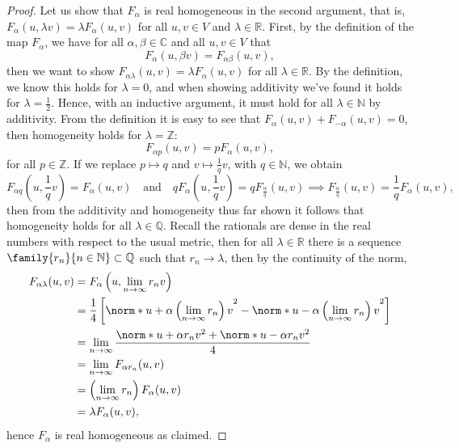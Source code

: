 \begin{proof}
    Let us show that \(F_{\alpha}\) is real homogeneous in the second argument, that is, \(F_{\alpha}(u,\lambda v) = \lambda F_{\alpha}(u,v)\) for all \(u,v \in V\) and \(\lambda \in \mathbb{R}\). First, by the definition of the map \(F_{\alpha}\), we have for all \(\alpha, \beta \in \mathbb{C}\) and all \(u, v \in V\) that
    \begin{equation*}
        F_{\alpha}(u, \beta v) = F_{\alpha \beta}(u, v),
    \end{equation*}
    then we want to show \(F_{\alpha \lambda}(u, v) = \lambda F_{\alpha}(u,v)\) for all \(\lambda \in \mathbb{R}\). By the definition, we know this holds for \(\lambda = 0\), and when showing additivity we've found it holds for \(\lambda = \frac12\). Hence, with an inductive argument, it must hold for all \(\lambda \in \mathbb{N}\) by additivity. From the definition it is easy to see that \(F_{\alpha}(u,v) + F_{-\alpha}(u,v) = 0\), then homogeneity holds for \(\lambda = \mathbb{Z}\):
    \begin{equation*}
        F_{\alpha p}(u, v) = p F_{\alpha}(u, v),
    \end{equation*}
    for all \(p \in \mathbb{Z}\). If we replace \(p \mapsto q\) and \(v \mapsto \frac1q v\), with \(q \in \mathbb{N}\), we obtain
    \begin{equation*}
        F_{\alpha q}\left(u, \frac{1}{q}v\right) = F_{\alpha}(u,v)\quad\text{and}\quad qF_{\alpha}\left(u, \frac{1}{q}v\right) = q F_{\frac{\alpha}{q}}(u,v) \implies F_{\frac{\alpha}{q}}(u,v) = \frac{1}{q}F_{\alpha}(u,v),
    \end{equation*}
    then from the additivity and homogeneity thus far shown it follows that homogeneity holds for all \(\lambda \in \mathbb{Q}\). Recall the rationals are dense in the real numbers with respect to the usual metric, then for all \(\lambda \in \mathbb{R}\) there is a sequence \(\family{r_n}{n\in \mathbb{N}}\subset \mathbb{Q}\) such that \(r_n \to \lambda\), then by the continuity of the norm,
    \begin{align*}
        F_{\alpha \lambda}(u,v) &= F_{\alpha}\left(u, \lim_{n\to\infty} r_n v\right)\\
                                &= \frac14 \left[\norm*{u + \alpha \left(\lim_{n\to\infty} r_n\right) v}^2 - \norm*{u - \alpha \left(\lim_{n\to\infty} r_n\right) v}^2\right]\\
                                &= \lim_{n\to\infty}\frac{\norm*{u + \alpha r_n v}^2 + \norm*{u - \alpha r_n v}^2}{4}\\
                                &= \lim_{n\to\infty} F_{\alpha r_n}(u,v)\\
                                &= \left(\lim_{n\to \infty} r_n\right)F_{\alpha}(u,v)\\
                                &= \lambda F_{\alpha}(u,v),
    \end{align*}
    hence \(F_{\alpha}\) is real homogeneous as claimed.


\end{proof}
